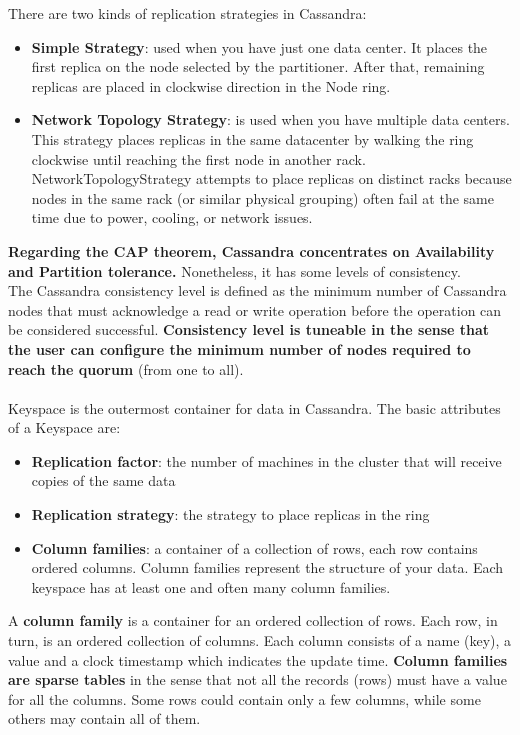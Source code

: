 \documentclass[10pt,a4paper]{article}
\newcommand{\nline}{\\~\\}
\begin{document}
\pagebreak
There are two kinds of replication strategies in Cassandra:
\begin{itemize}
	\item \textbf{Simple Strategy}: used when you have just one data center. It places the first replica on the node selected by the partitioner. After that, remaining replicas are placed in clockwise direction in the Node ring.
	\item \textbf{Network Topology Strategy}: is used when you have multiple data centers. This strategy places replicas in the same datacenter by walking the ring clockwise until reaching the first node in another rack. NetworkTopologyStrategy attempts to place replicas on distinct racks because nodes in the same rack (or similar physical grouping) often fail at the same time due to power, cooling, or network issues.
\end{itemize}
\textbf{Regarding the CAP theorem, Cassandra concentrates on Availability and Partition tolerance.} Nonetheless, it has some levels of consistency. \\
The Cassandra consistency level is defined as the minimum number of Cassandra nodes that must acknowledge a read or write operation before the operation can be considered successful. \textbf{Consistency level is tuneable in the sense that the user can configure the minimum number of nodes required to reach the quorum} (from one to all).
\nline
Keyspace is the outermost container for data in Cassandra. The basic attributes of a Keyspace are: 
\begin{itemize}
	\item \textbf{Replication factor}: the number of machines in the cluster that will receive copies of the same data
	\item \textbf{Replication strategy}: the strategy to place replicas in the ring
	\item \textbf{Column families}: a container of a collection of rows, each row contains ordered columns. Column families represent the structure of your data. Each keyspace has at least one and often many column families.
\end{itemize}
A\textbf{ column family} is a container for an ordered collection of rows. Each row, in turn, is an ordered collection of columns. Each column consists of a name (key), a value and a clock timestamp which indicates the update time. \textbf{Column families are sparse tables} in the sense that not all the records (rows) must have a value for all the columns. Some rows could contain only a few columns, while some others may contain all of them.  \\
\end{document}
